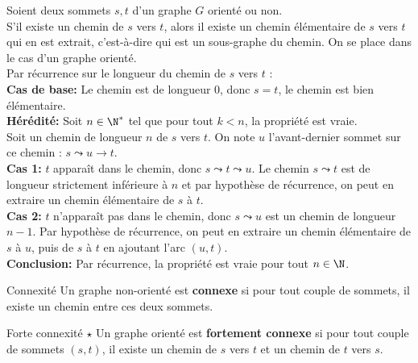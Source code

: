 \documentclass[french, 11pt]{article}
\begin{document}
\vspace*{-0.5cm}

\begin{prop}{}{}
    Soient deux sommets $s,t$ d'un graphe $G$ orienté ou non.\\
    S'il existe un chemin de $s$ vers $t$, alors il existe un chemin élémentaire de $s$ vers $t$ qui en est extrait, c'est-à-dire qui est un sous-graphe du chemin.
    \tcblower
    On se place dans le cas d'un graphe orienté.\\
    Par récurrence sur le longueur du chemin de $s$ vers $t$ :\\
    \textbf{Cas de base:} Le chemin est de longueur 0, donc $s=t$, le chemin est bien élémentaire.\\
    \textbf{Hérédité:} Soit $n\in\N^*$ tel que pour tout $k<n$, la propriété est vraie.\\
    Soit un chemin de longueur $n$ de $s$ vers $t$. On note $u$ l'avant-dernier sommet sur ce chemin : $s\leadsto u \to t$.\\
    \textbf{Cas 1:} $t$ apparaît dans le chemin, donc $s\leadsto t \leadsto u$. Le chemin $s\leadsto t$ est de longueur strictement inférieure à $n$ et par hypothèse de récurrence, on peut en extraire un chemin élémentaire de $s$ à $t$.\\
    \textbf{Cas 2:} $t$ n'apparaît pas dans le chemin, donc $s\leadsto u$ est un chemin de longueur $n-1$. Par hypothèse de récurrence, on peut en extraire un chemin élémentaire de $s$ à $u$, puis de $s$ à $t$ en ajoutant l'arc $(u,t)$.\\
    \textbf{Conclusion:} Par récurrence, la propriété est vraie pour tout $n\in\N$.
\end{prop}

\vspace*{-0.5cm}

\begin{defi}{Connexité}{}
    Un graphe non-orienté est \textbf{connexe} si pour tout couple de sommets, il existe un chemin entre ces deux sommets.
\end{defi}

\vspace*{-0.5cm}

\begin{defi}{Forte connexité $\star$}{}
    Un graphe orienté est \textbf{fortement connexe} si pour tout couple de sommets $(s,t)$, il existe un chemin de $s$ vers $t$ et un chemin de $t$ vers $s$.
\end{defi}
\end{document}
